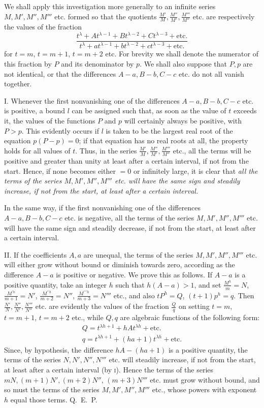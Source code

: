 We shall apply this investigation more generally to an infinite series $M,\allowbreak M',\allowbreak M'',\allowbreak M'''$ etc. formed so that the quotients $\frac{M'}{M},\frac{M''}{M'},\frac{M'''}{M''}$ etc. are respectively the values of the fraction
\[
\frac{t^{\lambda}+At^{\lambda-1}+Bt^{\lambda-2}+Ct^{\lambda-3}+\mathrm{etc.}}
{t^{\lambda}+at^{\lambda-1}+bt^{\lambda-2}+ct^{\lambda-3}+\mathrm{etc.}}
\]
for $t=m$, $t=m+1$, $t=m+2$ etc. For brevity we shall denote the numerator of this fraction by $P$ and its denominator by $p$. We shall also suppose that $P,p$ are not identical, or that the differences $A-a,B-b,C-c$ etc. do not all vanish together.

I. Whenever the first nonvanishing one of the differences $A-a,B-b,C-c$ etc. is positive, a bound $l$ can be assigned such that, as soon as the value of $t$ exceeds it, the values of the functions $P$ and $p$ will certainly always be positive, with $P>p$. This evidently occurs if $l$ is taken to be the largest real root of the equation $p(P-p)=0$; if that equation has no real roots at all, the property holds for all values of $t$. Thus, in the series $\frac{M'}{M},\frac{M''}{M'},\frac{M'''}{M''}$ etc., all the terms will be positive and greater than unity at least after a certain interval, if not from the start. Hence, if none becomes either $=0$ or infinitely large, it is clear that
\textit{all the terms of the series $M,M',M'',M'''$ etc. will have the same sign and steadily increase, if not from the start, at least after a certain interval.}

In the same way, if the first nonvanishing one of the differences $A-a,B-b,C-c$ etc. is negative, all the terms of the series $M,M',M'',M'''$ etc. will have the same sign and steadily decrease, if not from the start, at least after a certain interval.

II. If the coefficients $A,a$ are unequal, the terms of the series $M,\allowbreak M',\allowbreak M'',\allowbreak M'''$ etc. will either grow without bound or diminish towards zero, according as the difference $A-a$ is positive or negative. We prove this as follows. If $A-a$ is a positive quantity, take an integer $h$ such that $h(A-a)>1$, and set $\frac{M^h}{m}=N$, $\frac{M^{\prime h}}{m+1}=N'$, $\frac{M^{\prime\prime h}}{m+2}=N''$, $\frac{M^{\prime\prime\prime h}}{m+3}=N'''$ etc., and also $tP^h=Q$, $(t+1)p^h=q$. Then $\frac{N'}{N},\frac{N''}{N'},\frac{N'''}{N''}$ etc. are evidently the values of the fraction $\frac{Q}{q}$ on setting $t=m$, $t=m+1$, $t=m+2$ etc., while $Q,q$ are algebraic functions of the following form:
\[
\begin{array}{l}
Q=t^{\lambda h+1}+hAt^{\lambda h}+\mathrm{etc.}\\
q=t^{\lambda h+1}+(ha+1)t^{\lambda h}+\mathrm{etc.}
\end{array}
\]
Since, by hypothesis, the difference $hA-(ha+1)$ is a positive quantity, the terms of the series $N,N',N'',N'''$ etc. will steadily increase, if not from the start, at least after a certain interval (by \textsc{i}). Hence the terms of the series $mN,(m+1)N',(m+2)N''$, $(m+3)N'''$ etc. must grow without bound, and so must the terms of the series $M,M',M'',M'''$ etc., whose powers with exponent $h$ equal those terms. Q.~E.~P.

